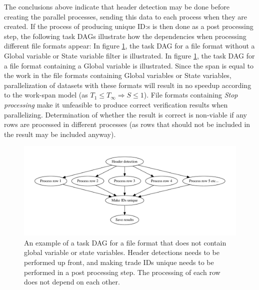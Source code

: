 The conclusions above indicate that header detection may be done before creating the parallel processes, sending this data to each process when they are created.
If the process of producing unique ID:s is then done as a post processing step, the following task DAGs illustrate how the dependencies when processing different
file formats appear: In figure \ref{fig:embarrassing_dag}, the task DAG for a file format without a Global variable or State variable filter is illustrated.
In figure \ref{fig:embarrassing_dag}, the task DAG for a file format containing a Global variable is illustrated. Since the span is equal to the work
in the file formats containing Global variables or State variables, parallelization of datasets with these formats will result in no speedup according to the %
work-span model (as $T_1 \leq T_\infty \Rightarrow S \leq 1$). File formats containing \textit{Stop processing} make it unfeasible to produce correct verification results
when parallelizing. Determination of whether the result is correct is non-viable if any rows are processed in different processes (as rows that should not be included in the result may be included anyway).

\begin{figure}
  \centering
  \includegraphics[width=200mm]{figures/embarrassing_file_format.pdf}
  \caption[Task DAG for a file format that does not contain global or state variables.]{An example of a task DAG for a file format that does not contain global variable or state variables. Header detections needs
  to be performed up front, and making trade IDs unique needs to be performed in a post processing step. The processing of each row does not depend on each other.}
  \label{fig:embarrassing_dag}
\end{figure}

